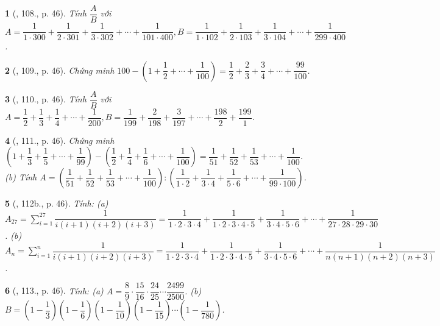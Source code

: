 \documentclass{article}
\newtheorem{baitoan}{}
\begin{document}
\begin{baitoan}[\cite{Binh_Toan_6_tap_2}, 108., p. 46]
	Tính $\dfrac{A}{B}$ với $A = \dfrac{1}{1\cdot300} + \dfrac{1}{2\cdot301} + \dfrac{1}{3\cdot302} + \cdots + \dfrac{1}{101\cdot400},B = \dfrac{1}{1\cdot102} + \dfrac{1}{2\cdot103} + \dfrac{1}{3\cdot104} + \cdots + \dfrac{1}{299\cdot400}$.
\end{baitoan}

\begin{baitoan}[\cite{Binh_Toan_6_tap_2}, 109., p. 46]
	Chứng minh $100 - \left(1 + \dfrac{1}{2} + \cdots + \dfrac{1}{100}\right) = \dfrac{1}{2} + \dfrac{2}{3} + \dfrac{3}{4} + \cdots + \dfrac{99}{100}$.
\end{baitoan}

\begin{baitoan}[\cite{Binh_Toan_6_tap_2}, 110., p. 46]
	Tính $\dfrac{A}{B}$ với $A = \dfrac{1}{2} + \dfrac{1}{3} + \dfrac{1}{4} + \cdots + \dfrac{1}{200},B = \dfrac{1}{199} + \dfrac{2}{198} + \dfrac{3}{197} + \cdots + \dfrac{198}{2} + \dfrac{199}{1}$.
\end{baitoan}

\begin{baitoan}[\cite{Binh_Toan_6_tap_2}, 111., p. 46]
	Chứng minh $\left(1 + \dfrac{1}{3} + \dfrac{1}{5} + \cdots + \dfrac{1}{99}\right) - \left(\dfrac{1}{2} + \dfrac{1}{4} + \dfrac{1}{6} + \cdots + \dfrac{1}{100}\right) = \dfrac{1}{51} + \dfrac{1}{52} + \dfrac{1}{53} + \cdots + \dfrac{1}{100}$. (b) Tính $A = \left(\dfrac{1}{51} + \dfrac{1}{52} + \dfrac{1}{53} + \cdots + \dfrac{1}{100}\right):\left(\dfrac{1}{1\cdot2} + \dfrac{1}{3\cdot4} + \dfrac{1}{5\cdot6} + \cdots + \dfrac{1}{99\cdot100}\right)$.
\end{baitoan}

\begin{baitoan}[\cite{Binh_Toan_6_tap_2}, 112b., p. 46]
	Tính: (a) $A_{27} = \sum_{i=1}^{27} \dfrac{1}{i(i + 1)(i + 2)(i + 3)} = \dfrac{1}{1\cdot2\cdot3\cdot4} + \dfrac{1}{1\cdot2\cdot3\cdot4\cdot5} + \dfrac{1}{3\cdot4\cdot5\cdot6} + \cdots + \dfrac{1}{27\cdot28\cdot29\cdot30}$. (b) $A_n = \sum_{i=1}^n \dfrac{1}{i(i + 1)(i + 2)(i + 3)} = \dfrac{1}{1\cdot2\cdot3\cdot4} + \dfrac{1}{1\cdot2\cdot3\cdot4\cdot5} + \dfrac{1}{3\cdot4\cdot5\cdot6} + \cdots + \dfrac{1}{n(n + 1)(n + 2)(n + 3)}$.
\end{baitoan}

\begin{baitoan}[\cite{Binh_Toan_6_tap_2}, 113., p. 46]
	Tính: (a) $A = \dfrac{8}{9}\cdot\dfrac{15}{16}\cdot\dfrac{24}{25}\cdots\dfrac{2499}{2500}$. (b) $B = \left(1 - \dfrac{1}{3}\right)\left(1 - \dfrac{1}{6}\right)\left(1 - \dfrac{1}{10}\right)\left(1 - \dfrac{1}{15}\right)\cdots\left(1 - \dfrac{1}{780}\right)$.
\end{baitoan}
\end{document}
